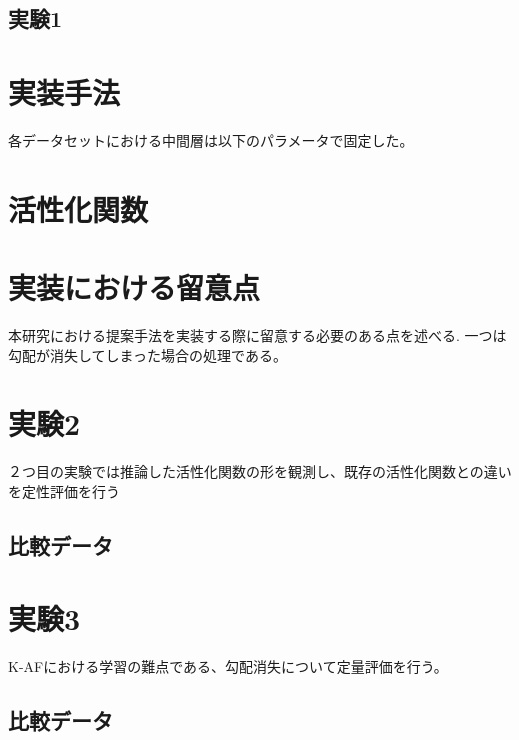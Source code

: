 \subsection{実験1}



\section{実装手法}

各データセットにおける中間層は以下のパラメータで固定した。



\section{活性化関数}



\section{実装における留意点}
本研究における提案手法を実装する際に留意する必要のある点を述べる.
一つは勾配が消失してしまった場合の処理である。


\section{実験2}
\label{exp2}
２つ目の実験では推論した活性化関数の形を観測し、既存の活性化関数との違いを定性評価を行う
\subsection{比較データ}


\section{実験3}
\label{exp3}
K-AFにおける学習の難点である、勾配消失について定量評価を行う。
\subsection{比較データ}


